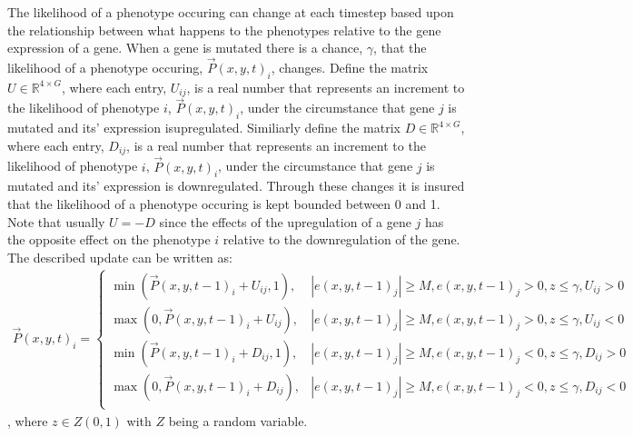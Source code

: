 \documentclass[\main/thesis.tex]{subfiles}
\begin{document}
The likelihood of a phenotype occuring can change at each timestep based upon 
the relationship between what happens to the phenotypes relative to the gene 
expression of a gene. When a gene is mutated there is a chance, $\gamma$, that 
the likelihood of a phenotype occuring, $\vec{P}(x, y, t)_i$, changes. 
Define the matrix $U {\in} \mathbb{R}^{4{\times}G}$, where each entry, 
$U_{ij}$, is a real number that represents an increment to the likelihood of 
phenotype $i$, $\vec{P}(x, y, t)_i$, under the circumstance that gene $j$ is 
mutated and its' expression isupregulated. Similiarly define the matrix
$D {\in} \mathbb{R}^{4{\times}G}$, where each entry, $D_{ij}$, is a real 
number that represents an increment to the likelihood of phenotype $i$,
$\vec{P}(x, y, t)_i$, under the circumstance that gene $j$ is mutated and its' 
expression is downregulated. Through these changes it is insured that the 
likelihood of a phenotype occuring is kept bounded between 0 and 1. Note that 
usually $U{=}{-}D$ since the effects of the upregulation of a gene $j$ has 
the opposite effect on the phenotype $i$ relative to the downregulation of the 
gene. The described update can be written as:
\begin{align*}
\vec{P}(x, y, t)_i {=} \begin{cases}
                         \min(\vec{P}(x, y, t{-}1)_i + U_{ij}, 1),
                           & |e(x, y, t{-}1)_j| {\ge} M,
                             e(x, y, t{-}1)_j {>} 0,
                             z {\le} \gamma,
                             U_{ij} {>} 0 \\
                         \max(0, \vec{P}(x, y, t{-}1)_i + U_{ij}),
                           & |e(x, y, t{-}1)_j| {\ge} M,
                             e(x, y, t{-}1)_j {>} 0,
                             z {\le} \gamma,
                             U_{ij} {<} 0 \\
                         \min(\vec{P}(x, y, t{-}1)_i + D_{ij}, 1), 
                           & |e(x, y, t{-}1)_j| {\ge} M,
                             e(x, y, t{-}1)_j {<} 0,
                             z {\le} \gamma,
                             D_{ij} {>} 0 \\
                         \max(0, \vec{P}(x, y, t{-}1)_i + D_{ij}), 
                           & |e(x, y, t{-}1)_j| {\ge} M,
                             e(x, y, t{-}1)_j {<} 0,
                             z {\le} \gamma,
                             D_{ij} {<} 0 \\
                        \end{cases}
\end{align*},
where $z {\in} Z(0, 1)$ with $Z$ being a random variable. 
\end{document}
